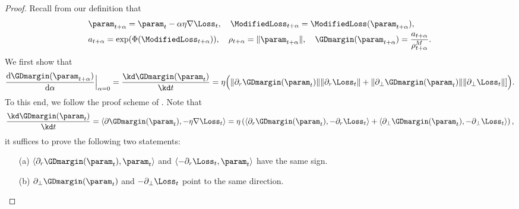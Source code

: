\begin{proof}
    Recall from our definition that
    \begin{align*}
        & \param_{t + \alpha} = \param_t - \alpha \eta \nabla \Loss_t, \quad \ModifiedLoss_{t+\alpha} = \ModifiedLoss (\param_{t+\alpha}), \\
        & a_{t+\alpha} = \exp (\Phi(\ModifiedLoss_{t+\alpha})), \quad \rho_{t+\alpha} = \| \param_{t+\alpha} \|, \quad \GDmargin (\param_{t + \alpha}) = \frac{a_{t+\alpha}}{\rho_{t + \alpha}^M}.
    \end{align*}
    We first show that
    \begin{equation*}
        \frac{\mathrm{d} \GDmargin(\param_{t+\alpha})}{\mathrm{d} \alpha}  \Big\vert_{\alpha = 0} = \frac{\kd \GDmargin(\param_t)}{\kd t} = \eta \Big(\| \partial_r \GDmargin (\param_t) \| \| \partial_r \Loss_t\| + \| \partial_\perp \GDmargin (\param_t) \| \| \partial_\perp \Loss_t\| ]\Big).
    \end{equation*}
    To this end, we follow the proof scheme of . Note that
    \begin{equation*}
        \frac{\kd \GDmargin(\param_t)}{\kd t} = \langle \partial \GDmargin (\param_t), - \eta \nabla \Loss_t \rangle = \eta \left( \langle \partial_r \GDmargin(\param_t), - \partial_r \Loss_t \rangle + \langle \partial_\perp \GDmargin(\param_t), - \partial_\perp \Loss_t \rangle \right),
    \end{equation*}
    it suffices to prove the following two statements:
    \begin{itemize}
        \item [(a)] $\langle \partial_r \GDmargin(\param_t), \param_t \rangle$ and $\langle -\partial_r \Loss_t, \param_t \rangle $ have the same sign. 
        \item [(b)] $\partial_\perp \GDmargin(\param_t)$ and $-\partial_\perp \Loss_t$ point to the same direction.  
\end{itemize}

\end{proof}

